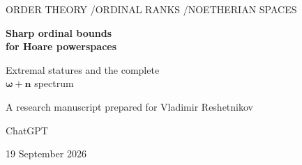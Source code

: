 \documentclass[11pt,a4paper]{article}
\theoremstyle{definition}
\newcommand{\HH}{\mathsf H}
\newcommand{\st}[1]{\lVert #1\rVert}
\numberwithin{equation}{section}
\begin{document}
\hypersetup{pageanchor=false}
\begin{titlepage}
\centering
\vspace*{14mm}
{\small\sffamily\color{OliveInk}ORDER THEORY \enspace/\enspace ORDINAL RANKS \enspace/\enspace NOETHERIAN SPACES\par}
\vspace{13mm}
{\LARGE\bfseries Sharp ordinal bounds\\[3pt]for Hoare powerspaces\par}
\vspace{7mm}
{\Large Extremal statures and the complete\\[2pt]$\boldsymbol{\omega+n}$ spectrum\par}
\vspace{13mm}
{\large A research manuscript prepared for Vladimir Reshetnikov\par}
\vspace{3mm}
{\normalsize ChatGPT\par}
\vspace{3mm}
{\normalsize 19 September 2026\par}
\vspace{13mm}
\begin{minipage}{0.91\textwidth}
\begin{abstract}
The stature of a Noetherian space is the ordinal rank of the top element
of its lattice of closed subsets.  We study the stature of its extended
Hoare powerspace, equipped with the lower Vietoris topology and including
the empty closed set.  Motivated by Question~1 in Section~15 of
Goubault-Larrecq and Laboureix, we give a proof of the universal bound
$1+\st X\leq\st{\HH X}\leq 2^{\st X}$, where exponentiation is ordinal.
The binary upper bound is already known for the finitary powersets of
well-quasi-orders; the argument here extends it to all Noetherian spaces.
Explicit $T_1$ examples attain the upper bound at every ordinal stature.
Consequently the older bound $\omega^\alpha$ is attainable at infinite
input stature $\alpha$ exactly when $\omega\alpha=\alpha$.


\end{abstract}
\end{minipage}
\end{titlepage}
\end{document}
